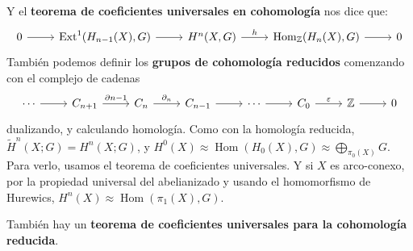 \documentclass[spanish]{book}
\theoremstyle{definition}
\newcommand{\Z}{\mathbb{Z}}
\DeclareMathOperator{\Hom}{Hom}
\DeclareMathOperator{\Ext}{Ext}
\begin{document}
Y el \textbf{teorema de coeficientes universales en cohomología} nos dice que:
\[\begin{tikzcd}
	0\arrow[r]&\Ext^1(H_{n-1}(X),G)\arrow[r]&H^n(X,G)\arrow[r,"h"]&\Hom_\Z(H_n(X),G)\arrow[r]&0
\end{tikzcd}\]
También podemos definir los \textbf{grupos de cohomología reducidos} comenzando con el complejo de cadenas
\[\begin{tikzcd}
	\cdots\arrow[r]&C_{n+1}\arrow[r,"\partial{n-1}"]&C_n\arrow[r,"\partial_n"]&C_{n-1}\arrow[r]&\cdots\arrow[r]&C_0\arrow[r,"\varepsilon"]&\Z\arrow[r]&0
\end{tikzcd}\]
dualizando, y calculando homología. Como con la homología reducida, $\tilde{H}^n(X;G)=H^n(X;G)$, y $H^0(X)\approx\Hom(H_0(X),G)\approx\bigoplus_{\pi_0(X)}G$. Para verlo, usamos el teorema de coeficientes universales. Y si $X$ es arco-conexo, por la propiedad universal del abelianizado y usando el homomorfismo de Hurewics, $H^n(X)\approx\Hom(\pi_1(X),G)$.

También hay un \textbf{teorema de coeficientes universales para la cohomología reducida}.
	
\end{document}
